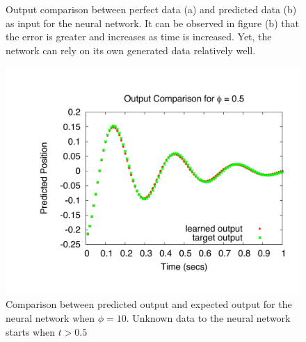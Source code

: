 \documentclass[11pt]{article}
\begin{document}
\begin{figure}[]
	\centering
		\caption{Output comparison between perfect data (a) and predicted data (b) as input for the neural network. It can be observed in figure (b) that the error is greater and increases as time is increased. Yet, the network can rely on its own generated data relatively well.}
	\label{fig:bpgt-3.0_damping_test_output_comp}	
\end{figure}


\begin{figure}[htbp]
	\centering
		\includegraphics[width=0.85\columnwidth]{../bpgt-3.0/damping_test/output_phi.pdf}
	\caption{Comparison between predicted output and expected output for the neural network when $\phi=10$. Unknown data to the neural network starts when $t > 0.5$}
	\label{fig:bpgt-3.0_damping_test_output_phi}
\end{figure}
\end{document}
